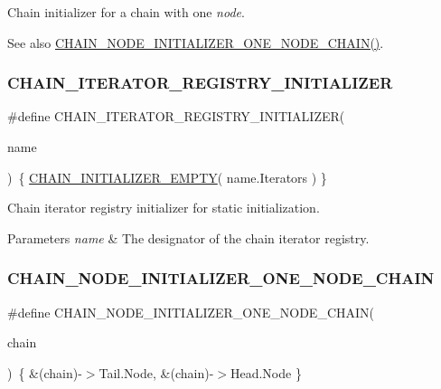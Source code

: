 Chain initializer for a chain with one {\itshape node}. 

\begin{DoxySeeAlso}{See also}
\mbox{\hyperlink{group__RTEMSScoreChain_ga1d87ba1964e8793cb2f399c7a36b0e06}{C\+H\+A\+I\+N\+\_\+\+N\+O\+D\+E\+\_\+\+I\+N\+I\+T\+I\+A\+L\+I\+Z\+E\+R\+\_\+\+O\+N\+E\+\_\+\+N\+O\+D\+E\+\_\+\+C\+H\+A\+I\+N()}}. 
\end{DoxySeeAlso}
\mbox{\label{group__RTEMSScoreChain_ga741b11fcd4a553695d5e90734b1b7dda}} 
\subsubsection{\texorpdfstring{CHAIN\_ITERATOR\_REGISTRY\_INITIALIZER}{CHAIN\_ITERATOR\_REGISTRY\_INITIALIZER}}
{\footnotesize\ttfamily \#define C\+H\+A\+I\+N\+\_\+\+I\+T\+E\+R\+A\+T\+O\+R\+\_\+\+R\+E\+G\+I\+S\+T\+R\+Y\+\_\+\+I\+N\+I\+T\+I\+A\+L\+I\+Z\+ER(\begin{DoxyParamCaption}\item[{}]{name }\end{DoxyParamCaption})~\{ \mbox{\hyperlink{group__RTEMSScoreChain_ga837c307db69277bfb97d3ed4c22bc420}{C\+H\+A\+I\+N\+\_\+\+I\+N\+I\+T\+I\+A\+L\+I\+Z\+E\+R\+\_\+\+E\+M\+P\+TY}}( name.\+Iterators ) \}}



Chain iterator registry initializer for static initialization. 


\begin{DoxyParams}{Parameters}
{\em name} & The designator of the chain iterator registry. \\
\hline
\end{DoxyParams}
\mbox{\label{group__RTEMSScoreChain_ga1d87ba1964e8793cb2f399c7a36b0e06}} 
\subsubsection{\texorpdfstring{CHAIN\_NODE\_INITIALIZER\_ONE\_NODE\_CHAIN}{CHAIN\_NODE\_INITIALIZER\_ONE\_NODE\_CHAIN}}
{\footnotesize\ttfamily \#define C\+H\+A\+I\+N\+\_\+\+N\+O\+D\+E\+\_\+\+I\+N\+I\+T\+I\+A\+L\+I\+Z\+E\+R\+\_\+\+O\+N\+E\+\_\+\+N\+O\+D\+E\+\_\+\+C\+H\+A\+IN(\begin{DoxyParamCaption}\item[{}]{chain }\end{DoxyParamCaption})~\{ \&(chain)-\/$>$Tail.\+Node, \&(chain)-\/$>$Head.\+Node \}}



